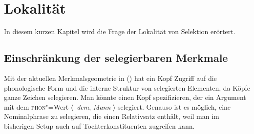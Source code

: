 
\chapter{Lokalität}
\label{Kapitel-Lokalität}


In diesem kurzen Kapitel wird die Frage der Lokalität von Selektion erörtert.

\section{Einschränkung der selegierbaren Merkmale}
\label{sec-synsem}

Mit der aktuellen Merkmalsgeometrie in () hat ein Kopf Zugriff auf die phonologische Form und 
die interne Struktur von selegierten Elementen, da Köpfe ganze Zeichen selegieren.
\ea
\z
Man könnte \zb einen Kopf spezifizieren, der ein Argument mit dem \textsc{phon}"=Wert $\langle$~\emph{dem}, \emph{Mann} $\rangle$ selegiert. Genauso ist es möglich,
eine Nominalphrase zu selegieren, die einen Relativsatz enthält, weil man im
bisherigen Setup auch auf Tochterkonstituenten zugreifen kann.

